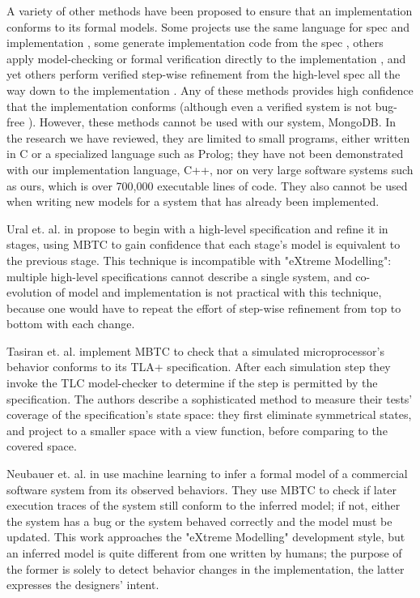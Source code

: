 \documentclass{vldb}
\begin{document}
A variety of other methods have been proposed to ensure that an implementation conforms to its formal models.
Some projects use the same language for spec and implementation \cite{KerGre99}, some generate implementation code from the spec \cite{Houhou17CodeGenerationFromSpecification}, others apply model-checking or formal verification directly to the implementation \cite{Holzmann04ModelDrivenVerification, Chudnov18ContinuousFormalVerification}, and yet others perform verified step-wise refinement from the high-level spec all the way down to the implementation \cite{Eiriksson95UsingFormalVerification}.
Any of these methods provides high confidence that the implementation conforms (although even a verified system is not bug-free \cite{Fonseca17EmpiricalStudy}). 
However, these methods cannot be used with our system, MongoDB.
In the research we have reviewed, they are limited to small programs, either written in C or a specialized language such as Prolog; they have not been demonstrated with our implementation language, C++, nor on very large software systems such as ours, which is over 700,000 executable lines of code.
They also cannot be used when writing new models for a system that has already been implemented.

Ural et. al. in \cite{Ural84AutomatedTestingOfProtocolSpecifications} propose to begin with a high-level specification and refine it in stages, using MBTC to gain confidence that each stage's model is equivalent to the previous stage.
This technique is incompatible with "eXtreme Modelling": multiple high-level specifications cannot describe a single system, and co-evolution of model and implementation is not practical with this technique, because one would have to repeat the effort of step-wise refinement from top to bottom with each change.

Tasiran et. al. \cite{Tasiran03AlphaMicroprocessor} implement MBTC to check that a simulated microprocessor's behavior conforms to its TLA+ specification.
After each simulation step they invoke the TLC model-checker to determine if the step is permitted by the specification.
The authors describe a sophisticated method to measure their tests' coverage of the specification's state space: they first eliminate symmetrical states, and project to a smaller space with a view function, before comparing to the covered space.

Neubauer et. al. in \cite{Neubauer12AutomatedContinuousQualityAssurance} use machine learning to infer a formal model of a commercial software system from its observed behaviors.
They use MBTC to check if later execution traces of the system still conform to the inferred model; if not, either the system has a bug or the system behaved correctly and the model must be updated.
This work approaches the "eXtreme Modelling" development style, but an inferred model is quite different from one written by humans; the purpose of the former is solely to detect behavior changes in the implementation, the latter expresses the designers' intent.
\end{document}

